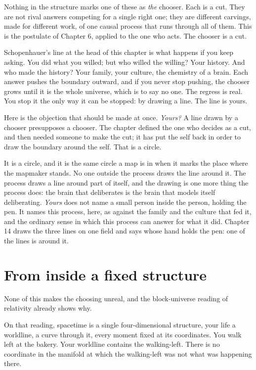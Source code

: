 Nothing in the structure marks one of these as \emph{the} chooser. Each is a cut. They are not rival answers competing for a single right one; they are different carvings, made for different work, of one causal process that runs through all of them. This is the postulate of Chapter 6, applied to the one who acts. The chooser is a cut.

Schopenhauer's line at the head of this chapter is what happens if you keep asking. You did what you willed; but who willed the willing? Your history. And who made the history? Your family, your culture, the chemistry of a brain. Each answer pushes the boundary outward, and if you never stop pushing, the chooser grows until it is the whole universe, which is to say no one. The regress is real. You stop it the only way it can be stopped: by drawing a line. The line is yours.

Here is the objection that should be made at once. \emph{Yours?} A line drawn by a chooser presupposes a chooser. The chapter defined the one who decides as a cut, and then needed someone to make the cut; it has put the self back in order to draw the boundary around the self. That is a circle.

It is a circle, and it is the same circle a map is in when it marks the place where the mapmaker stands. No one outside the process draws the line around it. The process draws a line around part of itself, and the drawing is one more thing the process does: the brain that deliberates is the brain that models itself deliberating. \emph{Yours} does not name a small person inside the person, holding the pen. It names this process, here, as against the family and the culture that fed it, and the ordinary sense in which this process can answer for what it did. Chapter 14 draws the three lines on one field and says whose hand holds the pen: one of the lines is around it.

\section*{From inside a fixed structure}

None of this makes the choosing unreal, and the block-universe reading of relativity already shows why.

On that reading, spacetime is a single four-dimensional structure, your life a worldline, a curve through it, every moment fixed at its coordinates. You walk left at the bakery. Your worldline contains the walking-left. There is no coordinate in the manifold at which the walking-left was not what was happening there.

